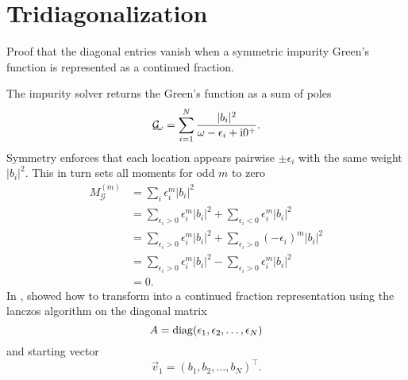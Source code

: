 
\chapter{Tridiagonalization}

Proof that the diagonal entries vanish when a symmetric impurity Green's function
is represented as a continued fraction.

The impurity solver returns the Green's function as a sum of poles
\begin{align}
    \mathcal{G}_{\!\omega} = \sum_{i=1}^N \frac{|b_i|^2}{\omega - \epsilon_i + \mathrm{i}0^+}.
    \label{eq:impurity-greens-function}
\end{align}
Symmetry enforces that each location appears pairwise $\pm\epsilon_i$
with the same weight $|b_i|^2$.
This in turn sets all moments for odd $m$ to zero 
\begin{align}
    M^{(m)}_{\mathcal{G}}
     & =
    \sum_i \epsilon_i^m |b_i|^2                                                            \\
     & =
    \sum_{\epsilon_i>0} \epsilon_i^m |b_i|^2 + \sum_{\epsilon_i<0} \epsilon_i^m |b_i|^2    \\
     & =
    \sum_{\epsilon_i>0} \epsilon_i^m |b_i|^2 + \sum_{\epsilon_i>0} (-\epsilon_i)^m |b_i|^2 \\
     & =
    \sum_{\epsilon_i>0} \epsilon_i^m |b_i|^2 - \sum_{\epsilon_i>0} \epsilon_i^m |b_i|^2    \\
     & =
    0.
\end{align}
In \cite[appendix B]{Lu2014}, \citeauthor{Lu2014} showed how to transform
 into a continued fraction representation
using the lanczos algorithm on the diagonal matrix
\begin{equation}
    A
    =
    \operatorname{diag}(\epsilon_1, \epsilon_2, \ldots, \epsilon_N)
\end{equation}
and starting vector
\begin{equation}
    \vec{v}_1 = (b_1, b_2, \ldots, b_N)^\intercal.
\end{equation}

